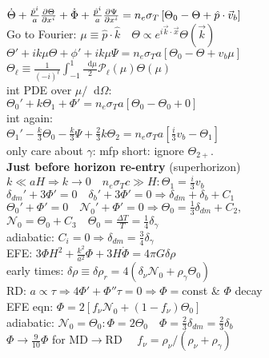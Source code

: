 \documentclass[12pt]{article}
\newcommand*\diff{\mathop{}\!\mathrm{d}}
\begin{document}
{	\\$\dot{\Theta}+\frac{\hat{p}^i}{a}\pdv{\Theta}{x^i}+\dot{\Phi}+\frac{\hat{p}^i}{a}\pdv{\Psi}{x^i}=n_e\sigma_T\left[\Theta_0-\Theta + \hat{p}\cdot\vec{v}_b\right]$
	\\Go to Fourier: $\mu\equiv \hat{p}\cdot\hat{k} \quad \Theta\propto e^{i\vec{k}\cdot\vec{x}}\Theta(\vec{k})$
	\\$\Theta'+ik\mu\Theta +\phi'+ik\mu\Psi=n_e\sigma_Ta[\Theta_0-\Theta+v_b\mu]$
	\\$\Theta_\ell\equiv\frac{1}{(-i)^\ell}\int_{-1}^1\frac{\diff\mu}{2}\mathcal{P}_\ell(\mu)\Theta(\mu)$
	\\int PDE over $\mu/\diff\Omega$: 
	\\$\Theta_0'+k\Theta_1+\Phi'=n_e\sigma_Ta[\Theta_0-\Theta_0+0]$
	\\int again:
	\\$\Theta_1'-\frac{k}{3}\Theta_0-\frac{k}{3}\Psi+\frac{2}{3}k\Theta_2=n_e\sigma_Ta\left[\frac{i}{3}v_b-\Theta_1\right]$
	\\only care about $\gamma$: mfp short: ignore $\Theta_{2+}$.
	\\\textbf{Just before horizon re-entry} (superhorizon)
	\\$k\ll aH \Rightarrow k\rightarrow 0 \quad n_e\sigma_Tc\gg H: \Theta_1=\frac{i}{3}v_b$
	\vspace{0.05cm}
	\\$\delta_{dm}'+3\Phi'=0 \quad \delta_{b}'+3\Phi'=0 \Rightarrow \delta_{dm}+\delta_b+C_1$
	\\$\Theta_0'+\Phi'=0 \quad \mathcal{N}_0'+\Phi'=0 \Rightarrow \Theta_0=\frac{1}{3}\delta_{dm}+C_2,$
	\vspace{0.05cm}
	\\$\mathcal{N}_0=\Theta_0+C_3 \quad \Theta_0=\frac{\Delta T}{T}=\frac{1}{4}\delta_\gamma$
	\\adiabatic: $C_i=0\Rightarrow \delta_{dm}=\frac{3}{4}\delta_\gamma$
	\\EFE: $3\Phi H^2 + \frac{k^2}{a^2}\Phi + 3H\dot{\Phi}=4\pi G \delta\rho$
	\\early times: $\delta\rho\equiv\delta\rho_r=4(\delta_\nu\mathcal{N}_0+\rho_\gamma\Theta_0)$
	\\RD: $a\propto\tau\Rightarrow 4\Phi'+\Phi''\tau=0\Rightarrow \Phi=$const \& $\Phi$ decay
	\\EFE eqn: $\Phi=2\left[f_\nu\mathcal{N}_0+(1-f_\nu)\Theta_0\right]$
	\\adiabatic: $\mathcal{N}_0=\Theta_0: \Phi=2\Theta_0 \quad \Phi=\frac{2}{3}\delta_{dm}=\frac{2}{3}\delta_b$
	\\$\Phi\rightarrow\frac{9}{10}\Phi$ for MD$\rightarrow$RD $ \quad f_\nu=\rho_\nu/(\rho_\nu+\rho_\gamma)$
}
\end{document}
